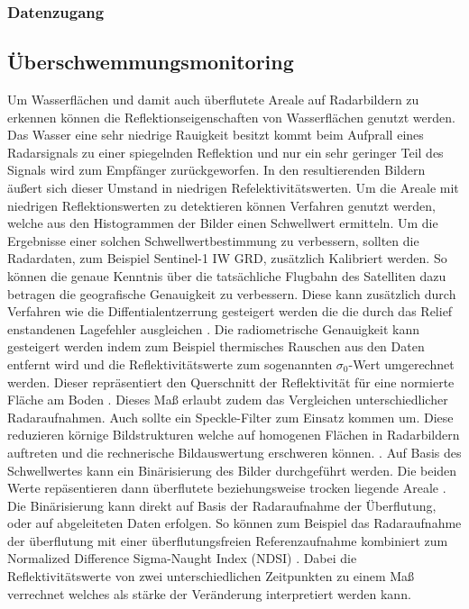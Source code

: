 \subsubsection{Datenzugang}
\subsection{Überschwemmungsmonitoring}
Um Wasserflächen und damit auch überflutete Areale auf Radarbildern zu erkennen können die Reflektionseigenschaften von Wasserflächen genutzt werden. Das Wasser eine 
sehr niedrige Rauigkeit besitzt kommt beim Aufprall eines Radarsignals zu einer spiegelnden Reflektion und nur ein sehr geringer Teil des Signals wird zum Empfänger 
zurückgeworfen. In den resultierenden Bildern äußert sich dieser Umstand in niedrigen Refelektivitätswerten. 
Um die Areale mit niedrigen Reflektionswerten zu detektieren können Verfahren genutzt werden, welche aus den Histogrammen der Bilder einen Schwellwert ermitteln.
Um die Ergebnisse einer solchen Schwellwertbestimmung zu verbessern, sollten die Radardaten, zum Beispiel Sentinel-1 IW GRD, zusätzlich Kalibriert werden. 
So können die genaue Kenntnis über die tatsächliche Flugbahn des Satelliten dazu betragen die geografische Genauigkeit zu verbessern. Diese kann zusätzlich durch Verfahren 
wie die Diffentialentzerrung gesteigert werden die die durch das Relief enstandenen Lagefehler ausgleichen \cite{einfuehrung_in_fernerkundung}.
Die radiometrische Genauigkeit kann gesteigert werden indem zum Beispiel thermisches Rauschen aus den Daten entfernt wird und die Reflektivitätswerte zum 
sogenannten $\sigma_0$-Wert umgerechnet werden. Dieser repräsentiert den Querschnitt der Reflektivität für eine normierte Fläche am Boden \cite{radiometric_calibration_of_S1_level1_products}.
Dieses Maß erlaubt zudem das Vergleichen unterschiedlicher Radaraufnahmen.  
Auch sollte ein Speckle-Filter zum Einsatz kommen um. Diese reduzieren körnige Bildstrukturen welche auf homogenen Flächen in Radarbildern auftreten und die 
rechnerische Bildauswertung erschweren können. \cite{einfuehrung_in_fernerkundung}\cite{sentinel_1_flood_mapping_tutorial}.  
Auf Basis des Schwellwertes kann ein Binärisierung des Bilder durchgeführt werden. Die beiden Werte repäsentieren dann überflutete beziehungsweise trocken liegende 
Areale \cite{sentinel_1_flood_mapping_tutorial}.
Die Binärisierung kann direkt auf Basis der Radaraufnahme der Überflutung, oder auf abgeleiteten Daten erfolgen. So können zum Beispiel das Radaraufnahme der überflutung mit 
einer überflutungsfreien Referenzaufnahme kombiniert zum Normalized Difference Sigma-Naught Index (NDSI) \cite{flood_proxy_mapping_ndsi}. Dabei die Reflektivitätswerte von 
zwei unterschiedlichen Zeitpunkten zu einem Maß verrechnet welches als stärke der Veränderung interpretiert werden kann. 

